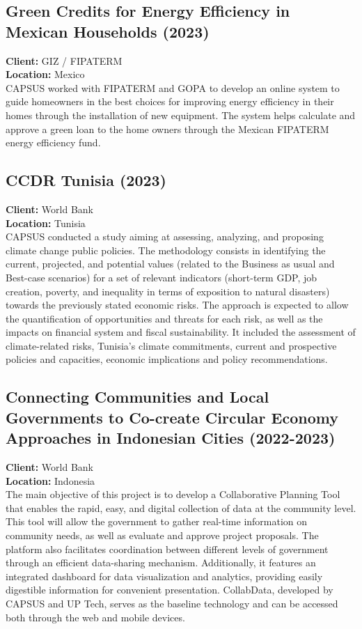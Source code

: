\documentclass[
	a4paper,
	12pt,
	unnumberedsections,
]{CSSullivanBusinessReport}
\begin{document}
\subsection{Green Credits for Energy Efficiency in Mexican Households (2023)}
\textbf{Client:}  GIZ / FIPATERM \\
\textbf{Location:}  Mexico \\[0.5em]
 CAPSUS worked with FIPATERM and GOPA to develop an online system to guide homeowners in the best choices for improving energy efficiency in their homes through the installation of new equipment. The system helps calculate and approve a green loan to the home owners through the Mexican FIPATERM energy efficiency fund.

\subsection{CCDR Tunisia (2023)}
\textbf{Client:}  World Bank \\
\textbf{Location:}  Tunisia \\[0.5em]
 CAPSUS conducted a study aiming at assessing, analyzing, and proposing climate change public policies. The methodology consists in identifying the current, projected, and potential values (related to the Business as usual and Best-case scenarios) for a set of relevant indicators (short-term GDP, job creation, poverty, and inequality in terms of exposition to natural disasters) towards the previously stated economic risks. The approach is expected to allow the quantification of opportunities and threats for each risk, as well as the impacts on financial system and fiscal sustainability. It included the assessment of climate-related risks, Tunisia’s climate commitments, current and prospective policies and capacities, economic implications and policy recommendations.

\subsection{Connecting Communities and Local Governments to Co-create Circular Economy Approaches in Indonesian Cities (2022-2023)}
\textbf{Client:}  World Bank \\
\textbf{Location:}  Indonesia \\[0.5em]
 The main objective of this project is to develop a Collaborative Planning Tool that enables the rapid, easy, and digital collection of data at the community level. This tool will allow the government to gather real-time information on community needs, as well as evaluate and approve project proposals. The platform also facilitates coordination between different levels of government through an efficient data-sharing mechanism. Additionally, it features an integrated dashboard for data visualization and analytics, providing easily digestible information for convenient presentation. CollabData, developed by CAPSUS and UP Tech, serves as the baseline technology and can be accessed both through the web and mobile devices.
\end{document}
